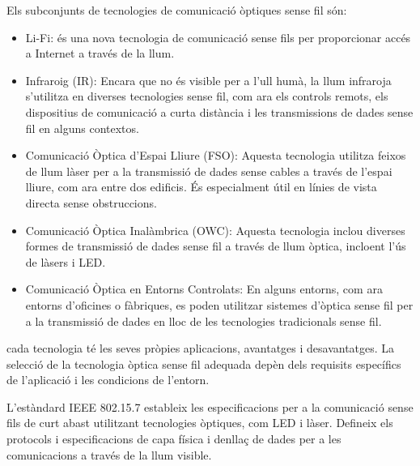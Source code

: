 Els subconjunts de tecnologies de comunicació òptiques sense fil són:
\begin{itemize}
    \item Li-Fi: és una nova tecnologia de comunicació sense fils per proporcionar accés a Internet a través de la llum.
    \item Infraroig (IR): Encara que no és visible per a l'ull humà, la llum infraroja s'utilitza en diverses tecnologies sense fil, com ara els controls remots, els dispositius de comunicació a curta distància i les transmissions de dades sense fil en alguns contextos.
    \item Comunicació Òptica d'Espai Lliure (FSO): Aquesta tecnologia utilitza feixos de llum làser per a la transmissió de dades sense cables a través de l'espai lliure, com ara entre dos edificis. És especialment útil en línies de vista directa sense obstruccions.
    \item Comunicació Òptica Inalàmbrica (OWC): Aquesta tecnologia inclou diverses formes de transmissió de dades sense fil a través de llum òptica, incloent l'ús de làsers i LED.
    \item Comunicació Òptica en Entorns Controlats: En alguns entorns, com ara entorns d'oficines o fàbriques, es poden utilitzar sistemes d'òptica sense fil per a la transmissió de dades en lloc de les tecnologies tradicionals sense fil.
\end{itemize}

cada tecnologia té les seves pròpies aplicacions, avantatges i desavantatges. La selecció de la tecnologia òptica sense fil adequada depèn dels requisits específics de l'aplicació i les condicions de l'entorn.

L'estàndard IEEE 802.15.7 estableix les especificacions per a la comunicació sense fils de curt abast utilitzant tecnologies òptiques, com LED i làser. Defineix els protocols i especificacions de capa física i denllaç de dades per a les comunicacions a través de la llum visible.